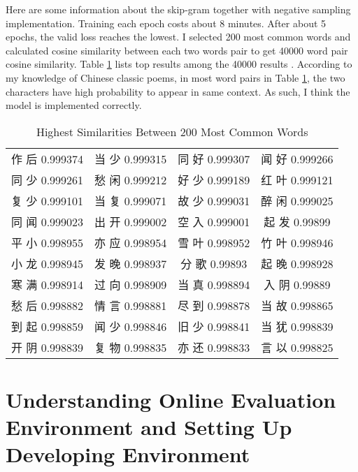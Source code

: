 \documentclass[12pt]{article}
\begin{document}
Here are some information about the skip-gram together with negative sampling implementation. Training each epoch costs about 8 minutes. After about 5 epochs, the valid loss reaches the lowest. I selected 200 most common words and calculated cosine similarity between each two words pair to get 40000 word pair cosine similarity. Table \ref{table:similarity} lists top results among the 40000 results . According to my knowledge of Chinese classic poems, in most word pairs in Table \ref{table:similarity}, the two characters have high probability to appear in same context. As such, I think the model is implemented correctly.
\begin{CJK*}{UTF8}{gbsn}
\begin{table}[h!]
\centering
\begin{tabular}{c c c c }
作 后 0.999374 &
当 少 0.999315 &
同 好 0.999307 &
闻 好 0.999266 \\
同 少 0.999261 &
愁 闲 0.999212 &
好 少 0.999189 &
红 叶 0.999121 \\
复 少 0.999101 &
当 复 0.999071 &
故 少 0.999031 &
醉 闲 0.999025 \\
同 闻 0.999023 &
出 开 0.999002 &
空 入 0.999001 &
起 发 0.99899 \\
平 小 0.998955 &
亦 应 0.998954 &
雪 叶 0.998952 &
竹 叶 0.998946 \\
小 龙 0.998945 &
发 晚 0.998937 &
分 歌 0.99893 &
起 晚 0.998928 \\
寒 满 0.998914 &
过 向 0.998909 &
当 真 0.998894 &
入 阴 0.99889 \\
愁 后 0.998882 &
情 言 0.998881 &
尽 到 0.998878 &
当 故 0.998865 \\
到 起 0.998859 &
闻 少 0.998846 &
旧 少 0.998841 &
当 犹 0.998839 \\
开 阴 0.998839 &
复 物 0.998835 &
亦 还 0.998833 &
言 以 0.998825 \\

\end{tabular}
\caption{Highest Similarities Between 200 Most Common Words}
\label{table:similarity}
\end{table}
\end{CJK*}


\break

\section{Understanding Online Evaluation Environment and Setting Up Developing Environment}\label{sec:setup}
\end{document}
